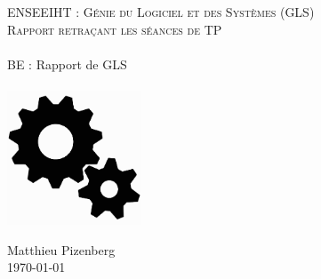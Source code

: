 \begin{titlepage}
\begin{center}

   \textsc{\Large ENSEEIHT : Génie du Logiciel et des Systèmes (GLS)}\\[6cm]
\textsc{\large Rapport retraçant les séances de TP}\\
\HRule \\
\huge{BE : Rapport de GLS\\}
\HRule \\[3cm]
\includegraphics[height=4cm]{../Images/gears.pdf}
\vfill

\LARGE{Matthieu Pizenberg}\\[1em]
\large{\today}

\end{center}
\end{titlepage}
